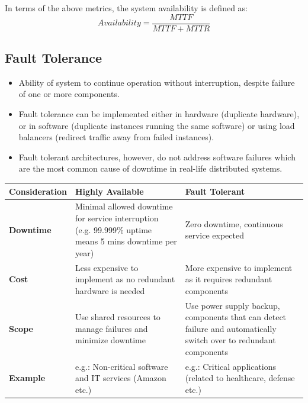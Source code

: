 \documentclass{article}
\begin{document}
In terms of the above metrics, the system availability is defined as:
\begin{equation}
    Availability = \frac{MTTF}{MTTF + MTTR}
\end{equation}

\subsection{Fault Tolerance}
\begin{itemize}
    \item Ability of system to continue operation without interruption, despite failure of one or more components. 
    
    \item Fault tolerance can be implemented either in hardware (duplicate hardware), or in software (duplicate instances running the same software) or using load balancers (redirect traffic away from failed instances). 
    
    \item Fault tolerant architectures, however, do not address software failures which are the most common cause of downtime in real-life distributed systems. 
\end{itemize}

\begin{tabular}{|p{}|p{}|p{}|}
    \hline 
    \textbf{Consideration} & \textbf{Highly Available} & \textbf{Fault Tolerant} \\
    \hline
    \textbf{Downtime} & Minimal allowed downtime for service interruption (e.g. 99.999\% uptime means 5 mins downtime per year) & Zero downtime, continuous service expected \\
    \hline
    \textbf{Cost} & Less expensive to implement as no redundant hardware is needed & More expensive to implement as it requires redundant components \\
    \hline
    \textbf{Scope} & Use shared resources to manage failures and minimize downtime & Use power supply backup, components that can detect failure and automatically switch over to redundant components \\
    \hline
    \textbf{Example} & e.g.: Non-critical software and IT services (Amazon etc.) & e.g.: Critical applications (related to healthcare, defense etc.) \\
    \hline
\end{tabular}
\end{document}
